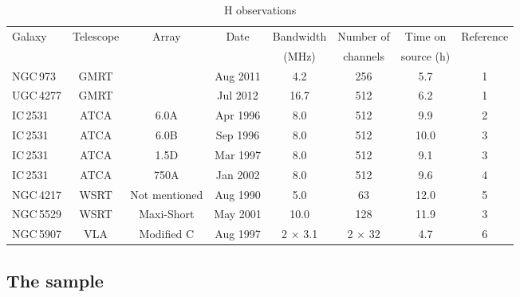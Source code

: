 \documentclass{aa}
\begin{document}
\begin{table}[t]
\caption{H{} observations}
\label{table:observations}
\centering
\begin{tabular}{l c c c c c c c}
\hline \hline\noalign{\smallskip}
Galaxy & Telescope & Array & Date & Bandwidth & Number of & Time on & Reference \\
 & & & & (MHz) & channels & source (h) & \\
\hline\noalign{\smallskip}
NGC\,973 & GMRT & & Aug 2011 & 4.2 & 256 & 5.7 & 1 \\
UGC\,4277 & GMRT & & Jul 2012 & 16.7 & 512 & 6.2 & 1 \\
IC\,2531 & ATCA & 6.0A & Apr 1996 & 8.0 & 512 & 9.9 & 2 \\
IC\,2531 & ATCA & 6.0B & Sep 1996 & 8.0 & 512 & 10.0 & 3 \\
IC\,2531 & ATCA & 1.5D & Mar 1997 & 8.0 & 512 & 9.1 & 3 \\
IC\,2531 & ATCA & 750A & Jan 2002 & 8.0 & 512 & 9.6 & 4 \\
NGC\,4217 & WSRT & Not mentioned & Aug 1990 & 5.0 & 63 & 12.0 & 5 \\
NGC\,5529 & WSRT & Maxi-Short & May 2001 & 10.0 & 128 & 11.9 & 3 \\
NGC\,5907 & VLA & Modified C & Aug 1997 & 2 $\times$ 3.1 & 2 $\times$ 32 & 4.7 & 6 \\
\hline
\end{tabular}
\end{table}

\subsection{The sample}
\end{document}
